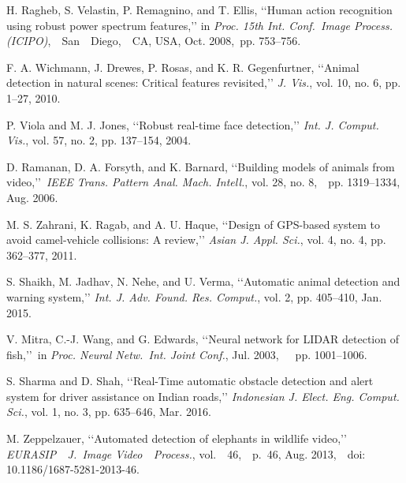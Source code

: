 \documentclass[14pt,a4paper,final]{extreport}
\begin{document}
\begin{thebibliography}{9}
{\fontsize{13pt}{8.4pt}\selectfont H. Ragheb, S. Velastin, P. Remagnino, and T. Ellis, ‘‘Human action recognition using robust power spectrum features,’’ in \textit{Proc. 15th Int. Conf.\ Image Process.  (ICIPO)},\ \ San\ \ Diego,\ \ CA,  USA,  Oct.  2008,\  pp. 753–756.\par}\par

{\fontsize{13pt}{8.4pt}\selectfont F. A. Wichmann, J. Drewes, P. Rosas, and K. R. Gegenfurtner, ‘‘Animal detection in natural scenes: Critical features revisited,’’ \textit{J. Vis.}, vol. 10, no. 6, pp. 1–27, 2010.\par}\par

{\fontsize{13pt}{8.4pt}\selectfont P. Viola and M. J. Jones, ‘‘Robust real-time face detection,’’ \textit{Int. J. Comput. Vis.}, vol. 57, no. 2, pp. 137–154, 2004.\par}\par

{\fontsize{13pt}{8.4pt}\selectfont D. Ramanan, D. A. Forsyth, and K. Barnard, ‘‘Building models of animals from video,’’\  \textit{IEEE Trans. Pattern Anal. Mach. Intell.}, vol. 28, no. 8,\ \  pp. 1319–1334, Aug. 2006.\par}\par

{\fontsize{13pt}{8.4pt}\selectfont M. S. Zahrani, K. Ragab, and A. U. Haque, ‘‘Design of GPS-based system to avoid camel-vehicle collisions: A review,’’ \textit{Asian J. Appl. Sci.}, vol. 4, no. 4, pp. 362–377, 2011.\par}\par

{\fontsize{13pt}{8.4pt}\selectfont S. Shaikh, M. Jadhav, N. Nehe, and U. Verma, ‘‘Automatic animal detection and warning system,’’ \textit{Int. J. Adv. Found. Res. Comput.}, vol. 2, pp. 405–410, Jan. 2015.\par}\par

{\fontsize{13pt}{8.4pt}\selectfont V. Mitra, C.-J. Wang, and G. Edwards, ‘‘Neural network for LIDAR detection of fish,’’\  in \textit{Proc. Neural Netw.\  Int. Joint Conf.}, Jul. 2003,\ \ \  pp. 1001–1006.\par}\par

{\fontsize{13pt}{8.4pt}\selectfont S. Sharma and D. Shah, ‘‘Real-Time automatic obstacle detection and alert system for driver assistance on Indian roads,’’ \textit{Indonesian J. Elect. Eng. Comput. Sci.}, vol. 1, no. 3, pp. 635–646, Mar. 2016.\par}\par

{\fontsize{13pt}{8.4pt}\selectfont M. Zeppelzauer, ‘‘Automated detection of elephants in wildlife video,’’ \textit{EURASIP\ \ J.\  Image  Video\ \  Process.}, vol.\ \ 46,\ \ p.\  46,  Aug.  2013,\ \  doi: 10.1186/1687-5281-2013-46.\par}\par
\end{thebibliography}
\end{document}
